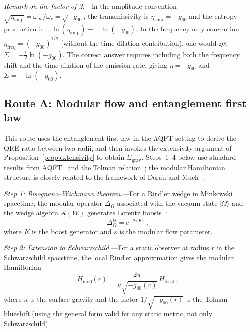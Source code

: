 \documentclass[aps,prd,preprint,superscriptaddress,longbibliography]{revtex4-2}
\newcommand{\ket}[1]{|#1\rangle}
\newcommand{\Sgrav}{\Sigma_{\mathrm{grav}}}
\begin{document}
\emph{Remark on the factor of 2.}---In the amplitude convention
$\sqrt{\eta_{\mathrm{amp}}} = \omega_\infty/\omega_r = \sqrt{-g_{00}}$,
the transmissivity is $\eta_{\mathrm{amp}} = -g_{00}$ and the entropy
production is $-\ln(\eta_{\mathrm{amp}}) = -\ln(-g_{00})$.  In the
frequency-only convention
$\eta_{\mathrm{freq}} = (-g_{00})^{1/2}$ (without the time-dilation
contribution), one would get
$\Sigma = -\frac{1}{2}\ln(-g_{00})$.  The correct answer requires
including both the frequency shift and the time dilation of the
emission rate, giving $\eta = -g_{00}$ and $\Sigma = -\ln(-g_{00})$.

\subsection{Route A: Modular flow and entanglement first law}
\label{sec:routeA}

This route uses the entanglement first law in the AQFT setting
to derive the QRE ratio between two radii, and then invokes
the extensivity argument of Proposition~\ref{prop:extensivity}
to obtain $\Sgrav$.  Steps~1--4 below use standard results from
AQFT~\cite{BisognanoWichmann1976} and the Tolman
relation~\cite{Tolman1930}; the modular Hamiltonian structure
is closely related to the framework of Dorau and
Much~\cite{DorauMuch2025}.

\emph{Step 1: Bisognano--Wichmann theorem.}---For a Rindler wedge in
Minkowski spacetime, the modular operator $\Delta_\Omega$ associated
with the vacuum state $\ket{\Omega}$ and the wedge algebra
$\mathcal{A}(W)$ generates Lorentz boosts~\cite{BisognanoWichmann1976}:
\begin{equation}
  \Delta_\Omega^{is} = e^{-2\pi K s}\,,
  \label{eq:BW}
\end{equation}
where $K$ is the boost generator and $s$ is the modular flow parameter.

\emph{Step 2: Extension to Schwarzschild.}---For a static observer at
radius $r$ in the Schwarzschild spacetime, the local Rindler
approximation gives the modular Hamiltonian
\begin{equation}
  H_{\mathrm{mod}}(r) = \frac{2\pi}{\kappa\sqrt{-g_{00}(r)}}\,H_{\mathrm{local}}\,,
  \label{eq:Hmod}
\end{equation}
where $\kappa$ is the surface gravity and the factor
$1/\sqrt{-g_{00}(r)}$ is the Tolman blueshift (using
the general form valid for any static metric, not only
Schwarzschild).
\end{document}
